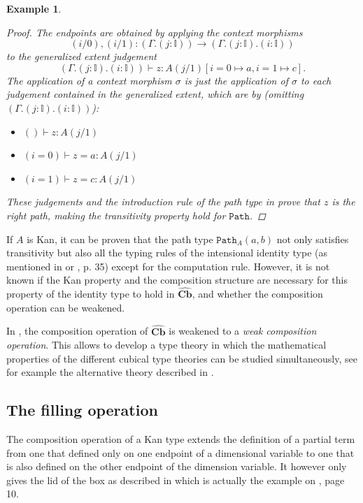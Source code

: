 \documentclass[12pt,a4paper,twoside,xetex]{book} %
\newcommand{\keyword}[1]{\emph{#1}\index{#1}}
\newtheorem{example}[theorem]{Example}
\newcommand{\psh}[1]{\widehat{#1}}
\newcommand{\op}[1]{\mathtt{#1}}
\newcommand{\cube}[0]{\textbf{Cb}}
\begin{document}
\begin{example}
\begin{proof}
The endpoints are obtained by applying the context morphisms $$(i/0),(i/1): 
(\Gamma . ( j : \mathbb{I})) \rightarrow (\Gamma. ( j : \mathbb{I}) . ( i :  
\mathbb{I}))$$ to the generalized extent judgement $$(\Gamma. ( j : \mathbb{I}) 
. ( i :  \mathbb{I})) \vdash z : A(j/1) [i =0 \mapsto a, i=1 \mapsto c].$$ The 
application of a context morphism $\sigma$  is just the application of $\sigma$ 
to each judgement contained in the generalized extent, which are by 
(omitting $(\Gamma. ( j : \mathbb{I}) . ( i :  \mathbb{I}))$):

\begin{itemize}
\item $ () \vdash z: A(j/1)$
\item $ (i = 0) \vdash z = a : A(j/1)$
\item $ (i = 1) \vdash z = c : A(j/1)$
\end{itemize}

These judgements and the introduction rule of the path type in  prove that $z$ is the right path, making the transitivity 
property hold for $\op{Path}$. 

\end{proof} 

\end{example}

If $A$ is Kan, it can be proven that the path type $\op{Path}_A(a,b)$ not only  
satisfies transitivity but also all the typing rules of  the intensional 
identity type (as mentioned in  or
\cite{Orton2019}, p. 35) except for the computation rule. However, it is not known if the Kan property and the composition structure are necessary for this property of the identity type to hold in $\psh{\cube}$, and 
whether the composition operation can be weakened. 

In \cite{Cavallo2019}, the composition operation of $\psh{\cube}$ is weakened to a \keyword{weak composition operation}. This allows to develop a type theory 
in which the mathematical properties of the different cubical type theories can 
be studied simultaneously, see for example the alternative theory described in 
.


\subsection{The filling operation}\label{filling}

The composition operation of a Kan type extends the definition of a partial 
term from one that defined only on one  endpoint  of a dimensional variable to 
one that is also defined on the other endpoint of the dimension variable. It 
however only gives the lid of the box as described in 
 which is actually the example  on \cite{Coquand2018}, 
page 10. 
\end{document}
